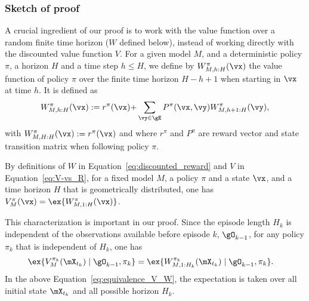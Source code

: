 \subsubsection*{Sketch of proof}
A crucial ingredient of our proof is to work with the value function over a random finite time horizon ($W$ defined below), instead of working directly with the discounted value function $V$. For a given model $M$, and a deterministic policy $\pi$, a horizon $H$ and a time step $h\le H$, we define by $W_{M,{h:H}}^\pi(\vx)$ the value function of policy $\pi$ over the finite time horizon ${H-h+1}$ when starting in $\vx$ at time $h$. It is defined as
\begin{equation}
    \label{eq:discounted_reward}
    W_{M,{h:H}}^\pi(\vx)  :=  r^\pi(\vx) {+}\sum_{\vy\in\gE}P^\pi(\vx,\vy)W_{M,{h+1:H}}^\pi(\vy),
\end{equation}
with $W_{M,{H:H}}^\pi(\vx):=r^\pi(\vx)$ and where $r^\pi$ and $P^\pi$ are reward vector and state transition matrix when following policy $\pi$.

By definitions of $W$ in Equation~\eqref{eq:discounted_reward} and $V$ in Equation~\eqref{eq:V-vs_R}, for a fixed model $M$, a policy $\pi$ and a state $\vx$, and a time horizon $H$ that is geometrically distributed, one has $V^{\pi}_M(\vx)=\ex{W_{M,1:H}^\pi(\vx)}$.

This characterization is important in our proof. Since the episode length $H_k$ is independent of the observations available before episode $k$, $\gO_{k-1}$, for any policy $\pi_k$ that is independent of $H_k$, one has
\begin{align}
    \ex{V^{\pi_k}_M(\mX_{t_k}) \mid {\gO_{k-1}}, \pi_k } 
    &= \ex{W^{\pi_k}_{M,1:H_k}(\mX_{t_k}) \mid \gO_{k-1}, \pi_k}.
    \label{eq:equivalence_V_W}
\end{align}
In the above Equation~\eqref{eq:equivalence_V_W}, the expectation is taken over all initial state $\mX_{t_k}$ and all possible horizon $H_k$.
    
